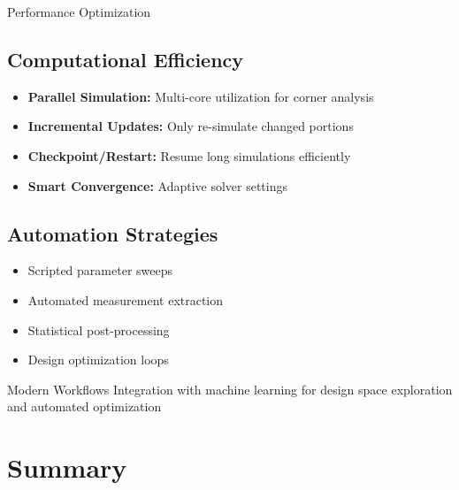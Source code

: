 \documentclass{beamer}
\begin{document}
\begin{frame}{Performance Optimization}
    \subsection{Computational Efficiency}
    \begin{itemize}
        \item \textbf{Parallel Simulation:} Multi-core utilization for corner analysis
        \item \textbf{Incremental Updates:} Only re-simulate changed portions
        \item \textbf{Checkpoint/Restart:} Resume long simulations efficiently
        \item \textbf{Smart Convergence:} Adaptive solver settings
    \end{itemize}
    
    \subsection{Automation Strategies}
    \begin{itemize}
        \item Scripted parameter sweeps
        \item Automated measurement extraction
        \item Statistical post-processing
        \item Design optimization loops
    \end{itemize}
    
    \begin{exampleblock}{Modern Workflows}
        Integration with machine learning for design space exploration and automated optimization
    \end{exampleblock}
\end{frame}

\section{Summary}
\end{document}
